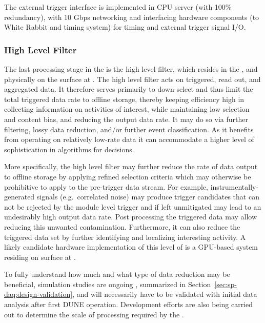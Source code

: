 The external trigger interface is implemented in  CPU server (with 100\%
redundancy), with 10 Gbps networking and interfacing hardware
components (to White Rabbit and  timing system) for timing and external trigger signal I/O.

\subsubsection{High Level Filter}
\label{sec:fd-daq:design-data-reduction}

The last processing stage in the  is the
high level filter, which resides in the , and physically
on the surface at .
The high level filter acts on triggered, read out, and aggregated data. 
It therefore serves primarily to down-select and thus
limit the total triggered data rate to offline storage, thereby keeping 
efficiency high in collecting information on activities of interest,
while maintaining low selection and content bias, and reducing the output data
rate. It may do so via 
further filtering, lossy data reduction, and/or further event
classification.
As it benefits from operating on relatively low-rate data it can accommodate a higher level of
sophistication in algorithms for  decisions.

More specifically, the high level filter may further reduce the rate of data output to offline storage by
applying refined selection criteria which may otherwise be prohibitive
to apply to the pre-trigger data stream.  For example, instrumentally-generated signals (e.g.~correlated noise)
may produce trigger candidates that can not be rejected by the module
level trigger and if left unmitigated may lead to an undesirably high
output data rate. 
Post processing the triggered data may allow reducing this unwanted
contamination.
Furthermore, it can also reduce the triggered data set by further identifying
and localizing interesting activity. A likely candidate hardware
implementation of this level of  is a GPU-based system
residing on surface at .

To fully understand how much and what type of data reduction may be
beneficial, simulation studies are ongoing \cite{bib:docdb11311},
summarized in Section~\ref{sec:sp-daq:design-validation}, and will
necessarily have to be
validated with initial data analysis after
first DUNE  operation. Development efforts are also being
carried out to determine the scale of 
processing required by the .


